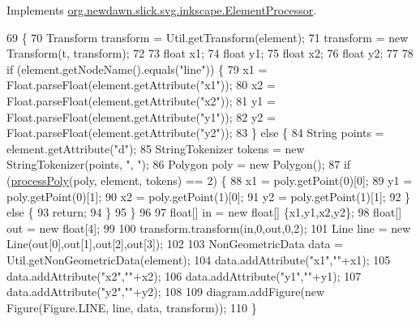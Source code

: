 Implements \mbox{\hyperlink{interfaceorg_1_1newdawn_1_1slick_1_1svg_1_1inkscape_1_1_element_processor_acd170a9e1119481edae885780db59a2e}{org.\+newdawn.\+slick.\+svg.\+inkscape.\+Element\+Processor}}.


\begin{DoxyCode}
69                                                                                                            
         \{
70         Transform transform = Util.getTransform(element);
71         transform = \textcolor{keyword}{new} Transform(t, transform); 
72         
73         \textcolor{keywordtype}{float} x1;
74         \textcolor{keywordtype}{float} y1;
75         \textcolor{keywordtype}{float} x2;
76         \textcolor{keywordtype}{float} y2;
77         
78         \textcolor{keywordflow}{if} (element.getNodeName().equals(\textcolor{stringliteral}{"line"})) \{
79             x1 = Float.parseFloat(element.getAttribute(\textcolor{stringliteral}{"x1"}));
80             x2 = Float.parseFloat(element.getAttribute(\textcolor{stringliteral}{"x2"}));
81             y1 = Float.parseFloat(element.getAttribute(\textcolor{stringliteral}{"y1"}));
82             y2 = Float.parseFloat(element.getAttribute(\textcolor{stringliteral}{"y2"}));
83         \} \textcolor{keywordflow}{else} \{
84             String points = element.getAttribute(\textcolor{stringliteral}{"d"});
85             StringTokenizer tokens = \textcolor{keyword}{new} StringTokenizer(points, \textcolor{stringliteral}{", "});
86             Polygon poly = \textcolor{keyword}{new} Polygon();
87             \textcolor{keywordflow}{if} (\mbox{\hyperlink{classorg_1_1newdawn_1_1slick_1_1svg_1_1inkscape_1_1_line_processor_aa3e9696d420d187f0921356b4075458a}{processPoly}}(poly, element, tokens) == 2) \{
88                 x1 = poly.getPoint(0)[0];
89                 y1 = poly.getPoint(0)[1];
90                 x2 = poly.getPoint(1)[0];
91                 y2 = poly.getPoint(1)[1];
92             \} \textcolor{keywordflow}{else} \{
93                 \textcolor{keywordflow}{return};
94             \}
95         \}
96         
97         \textcolor{keywordtype}{float}[] in = \textcolor{keyword}{new} \textcolor{keywordtype}{float}[] \{x1,y1,x2,y2\};
98         \textcolor{keywordtype}{float}[] out = \textcolor{keyword}{new} \textcolor{keywordtype}{float}[4];
99         
100         transform.transform(in,0,out,0,2);
101         Line line = \textcolor{keyword}{new} Line(out[0],out[1],out[2],out[3]);
102         
103         NonGeometricData data = Util.getNonGeometricData(element);
104         data.addAttribute(\textcolor{stringliteral}{"x1"},\textcolor{stringliteral}{""}+x1);
105         data.addAttribute(\textcolor{stringliteral}{"x2"},\textcolor{stringliteral}{""}+x2);
106         data.addAttribute(\textcolor{stringliteral}{"y1"},\textcolor{stringliteral}{""}+y1);
107         data.addAttribute(\textcolor{stringliteral}{"y2"},\textcolor{stringliteral}{""}+y2);
108         
109         diagram.addFigure(\textcolor{keyword}{new} Figure(Figure.LINE, line, data, transform));
110     \}
\end{DoxyCode}
